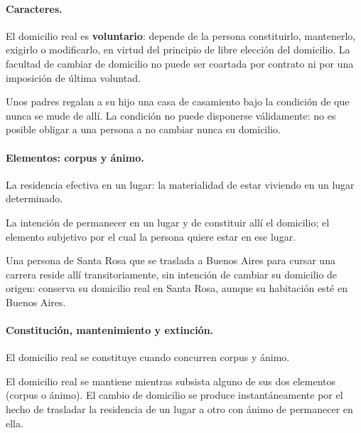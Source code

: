 \documentclass[12pt,oneside]{book}
\begin{document}
\paragraph{Caracteres.} El domicilio real es \textbf{voluntario}: depende de la persona constituirlo, mantenerlo, exigirlo o modificarlo, en virtud del principio de libre elección del domicilio. La facultad de cambiar de domicilio no puede ser coartada por contrato ni por una imposición de última voluntad.

\begin{ejemplo}
Unos padres regalan a su hijo una casa de casamiento bajo la condición de que nunca se mude de allí. La condición no puede disponerse válidamente: no es posible obligar a una persona a no cambiar nunca su domicilio.
\end{ejemplo}

\paragraph{Elementos: corpus y ánimo.}

\begin{definicion}[Corpus]
La residencia efectiva en un lugar: la materialidad de estar viviendo en un lugar determinado.
\end{definicion}

\begin{definicion}[Ánimo]
La intención de permanecer en un lugar y de constituir allí el domicilio; el elemento subjetivo por el cual la persona quiere estar en ese lugar.
\end{definicion}

\begin{ejemplo}
Una persona de Santa Rosa que se traslada a Buenos Aires para cursar una carrera reside allí transitoriamente, sin intención de cambiar su domicilio de origen: conserva su domicilio real en Santa Rosa, aunque su habitación esté en Buenos Aires.
\end{ejemplo}

\paragraph{Constitución, mantenimiento y extinción.} El domicilio real se constituye cuando concurren corpus y ánimo.

\begin{regla}
El domicilio real se mantiene mientras subsista alguno de sus dos elementos (corpus o ánimo). El cambio de domicilio se produce instantáneamente por el hecho de trasladar la residencia de un lugar a otro con ánimo de permanecer en ella.
\end{regla}
\end{document}
